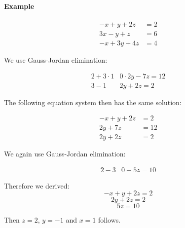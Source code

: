 \documentclass[a4paper,landscape,twocolumn]{article}
\begin{document}
\paragraph{Example}
\begin{align*}
  -x  +y +2z &= 2 \\
  3x  -y  +z  &=6 \\
  -x +3y +4z &= 4
\end{align*}

We use Gauss-Jordan elimination:

\begin{align*}
  2 + 3\cdot 1 & 0\cdot 2y - 7z = 12 \\
  3 - 1        & 2y + 2z = 2
\end{align*}

The following equation system then has the same solution:

\begin{align*}
  -x + y + 2z &= 2 \\
  2y + 7z &= 12 \\
  2y + 2z &= 2
\end{align*}

We again use Gauss-Jordan elimination:

\begin{align*}
  2 - 3 & 0 + 5z = 10
\end{align*}

Therefore we derived:
\[ -x + y + 2z = 2 \]
\[ 2y + 2z = 2 \]
\[ 5z = 10 \]

Then $z = 2$, $y = -1$ and $x = 1$ follows.
\end{document}
